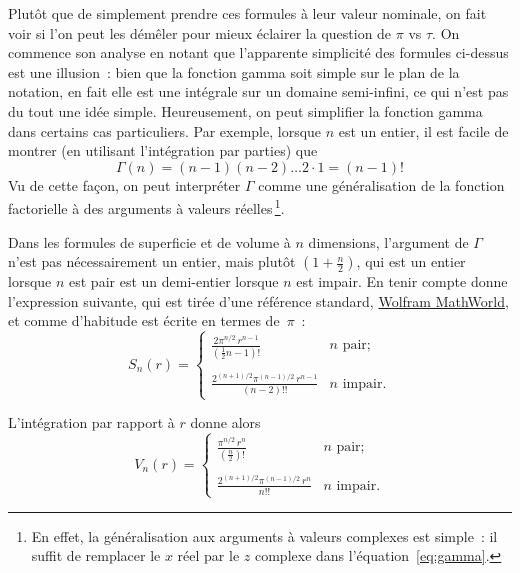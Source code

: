 Plutôt que de simplement prendre ces formules à leur valeur nominale, on fait voir si l'on peut les démêler pour mieux éclairer la question de $\pi$ vs $\tau$. On commence son analyse en notant que l'apparente simplicité des formules ci-dessus est une illusion~: bien que la fonction gamma soit simple sur le plan de la notation, en fait elle est une intégrale sur un domaine semi-infini, ce qui n'est pas du tout une idée simple. Heureusement, on peut simplifier la fonction gamma dans certains cas particuliers. Par exemple, lorsque $n$ est un entier, il est facile de montrer (en utilisant l'intégration par parties) que
\[
\Gamma(n) = (n-1)(n-2)\ldots 2\cdot 1 = (n-1)!
\]
Vu de cette façon, on peut interpréter $\Gamma$ comme une généralisation de la fonction factorielle à des arguments à valeurs réelles\,\footnote{En effet, la généralisation aux arguments à valeurs complexes est simple~: il suffit de remplacer le $x$ réel par le $z$ complexe dans l'équation~\eqref{eq:gamma}.}.

Dans les formules de superficie et de volume à $n$ dimensions, l'argument de $\Gamma$ n'est pas nécessairement un entier, mais plutôt $\left(1 + \frac{n}{2}\right)$, qui est un entier lorsque $n$ est pair est un demi-entier lorsque $n$ est impair. En tenir compte donne l'expression suivante, qui est tirée d'une référence standard, \href{https://mathworld.wolfram.com/Hypersphere.html}{Wolfram MathWorld}, et comme d'habitude est écrite en termes de~$\pi$~:
\begin{equation}
\label{eq:surface_area_mathworld}
S_n(r) = \begin{cases}
\displaystyle \frac{2\pi^{n/2}\,r^{n-1}}{(\frac{1}{2}n - 1)!} & n \text{ pair}; \\ \\
 \displaystyle \frac{2^{(n+1)/2}\pi^{(n-1)/2}\,r^{n-1}}{(n-2)!!} & n \text{ impair}.
\end{cases}
\end{equation}

L'intégration par rapport à $r$ donne alors
\begin{equation}
\label{eq:volume_mathworld}
V_n(r) = \begin{cases}
\displaystyle \frac{\pi^{n/2}\,r^n}{(\frac{n}{2})!} & n \text{ pair}; \\ \\
\displaystyle \frac{2^{(n+1)/2}\pi^{(n-1)/2}\,r^n}{n!!} & n \text{ impair}.
\end{cases}
\end{equation}

